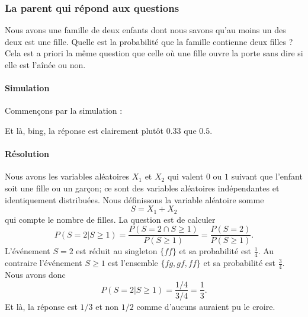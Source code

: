 \subsubsection{La parent qui répond aux questions}

Nous avons une famille de deux enfants dont nous savons qu'au moins un des deux est une fille. Quelle est la probabilité que la famille contienne deux filles ? Cela est a priori la même question que celle où une fille ouvre la porte sans dire si elle est l'aînée ou non.

\paragraph{Simulation}

Commençons par la simulation :



Et là, bing, la réponse est clairement plutôt \( 0.33\) que \( 0.5\).

\paragraph{Résolution}

Nous avons les variables aléatoires \( X_1\) et \( X_2\) qui valent \( 0\) ou \( 1\) suivant que l'enfant soit une fille ou un garçon; ce sont des variables aléatoires indépendantes et identiquement distribuées. Nous définissons la variable aléatoire somme 
\begin{equation}
    S=X_1+X_2
\end{equation}
qui compte le nombre de filles. La question est de calculer
\begin{equation}
    P( S=2|S\geq 1 )=\frac{ P(S=2\cap S\geq 1) }{ P(S\geq 1) }=\frac{ P(S=2) }{ P(S\geq 1) }.
\end{equation}
L'événement \( S=2\) est réduit au singleton \( \{ ff \}\) et sa probabilité est \( \frac{1}{ 4 }\). Au contraire l'événement \( S\geq 1\) est l'ensemble \( \{ fg,gf,ff \}\) et sa probabilité est \( \frac{ 3 }{ 4 }\). Nous avons donc
\begin{equation}
    P( S=2|S\geq 1 )=\frac{ 1/4 }{ 3/4 }=\frac{1}{ 3 }.
\end{equation}
Et là, la réponse est \( 1/3\) et non \( 1/2\) comme d'aucuns auraient pu le croire.


